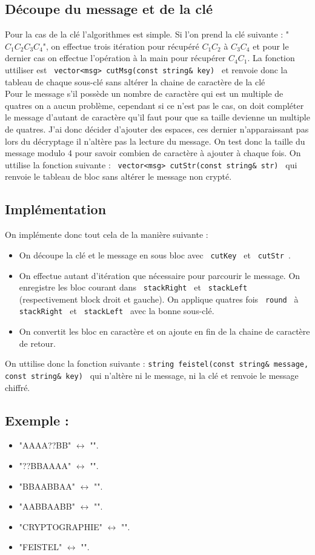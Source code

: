 \documentclass[10pt,a4paper]{article}
\begin{document}
\subsection*{Découpe du message et de la clé}
Pour la cas de la clé l'algorithmes est simple. Si l'on prend la clé suivante : "$C_1C_2C_3C_4$", on effectue trois itération pour récupéré $C_1C_2$ à $C_3C_4$ et pour le dernier cas on effectue l'opération à la main pour récupérer $C_4C_1$. La fonction uttiliser est \verb| vector<msg> cutMsg(const string& key) | et renvoie donc la tableau de chaque sous-clé sans altérer la chaine de caractère de la clé\\
Pour le message s'il possède un nombre de caractère qui est un multiple de quatres on a aucun problème, cependant si ce n'est pas le cas, on doit compléter le message d'autant de caractère qu'il faut pour que sa taille devienne un multiple de quatres. J'ai donc décider d'ajouter des espaces, ces dernier n'apparaissant pas lors du décryptage il n'altère pas la lecture du message. On test donc la taille du message modulo 4 pour savoir combien de caractère à ajouter à chaque fois. On uttilise la fonction suivante : \verb| vector<msg> cutStr(const string& str) | qui renvoie le tableau de bloc sans altérer le message non crypté.
\subsection*{Implémentation}
On implémente donc tout cela de la manière suivante :
\begin{itemize}
\item On découpe la clé et le message en sous bloc avec \verb| cutKey | et \verb| cutStr |.
\item On effectue autant d'itération que nécessaire pour parcourir le message.  On enregistre les bloc courant dans \verb| stackRight | et \verb| stackLeft | (respectivement block droit et gauche). On applique quatres fois \verb| round | à \verb| stackRight | et \verb| stackLeft | avec la bonne sous-clé.
\item On convertit les bloc en caractère et on ajoute en fin de la chaine de caractère de retour.
\end{itemize}
On uttilise donc la fonction suivante : \verb|string feistel(const string& message, const string& key) | qui n'altère ni le message, ni la clé et renvoie le message chiffré.
\subsection*{Exemple :}
\begin{itemize}
\item "AAAA??BB" $\leftrightarrow$ "".
\item "??BBAAAA" $\leftrightarrow$ "".
\item "BBAABBAA" $\leftrightarrow$ "".
\item "AABBAABB" $\leftrightarrow$ "".
\item "CRYPTOGRAPHIE" $\leftrightarrow$ "".
\item "FEISTEL" $\leftrightarrow$ "".
\end{itemize}
\end{document}
